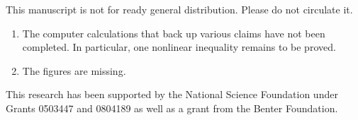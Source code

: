 \noindent





\bigskip




\newpage

This manuscript is not for ready general distribution.  Please do not circulate it.
\begin{enumerate}\wasitemize 
\item The computer calculations that back up various claims have not
  been completed.  In particular, one nonlinear inequality
  remains to be proved. 
\item The figures are missing.
\end{enumerate}\wasitemize 


\bigskip\noindent %
This research has been supported by the National Science Foundation
under Grants 0503447 and 0804189 as well as a grant from the Benter
Foundation.

\bigskip\noindent\svninfo 

\newpage

